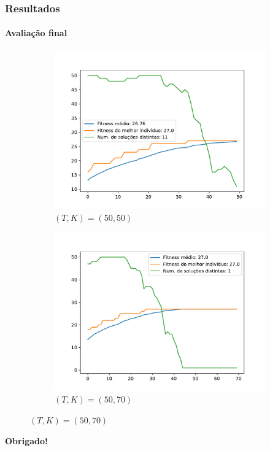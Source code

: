 \documentclass{beamer}
\begin{document}
	\begin{frame}
		\frametitle{Resultados}
		\framesubtitle{Avaliação final}
		\begin{figure}[!hb]
			\begin{subfigure}[b]{0.5\textwidth}
				\centering
				\includegraphics[width=\textwidth]{../relatorio/teste6_50_50.pdf}
				\caption{$(T,K)=(50,50)$}
			\end{subfigure}%
			\begin{subfigure}[b]{0.5\textwidth}
				\centering
				\includegraphics[width=\textwidth]{../relatorio/teste6_50_70.pdf}
				\caption{$(T,K)=(50,70)$}
			\end{subfigure}%
		\end{figure}
	\end{frame}
	
	\begin{frame}
		\begin{center}
			\textbf{\LARGE Obrigado!}
		\end{center}
	\end{frame}
\end{document}
